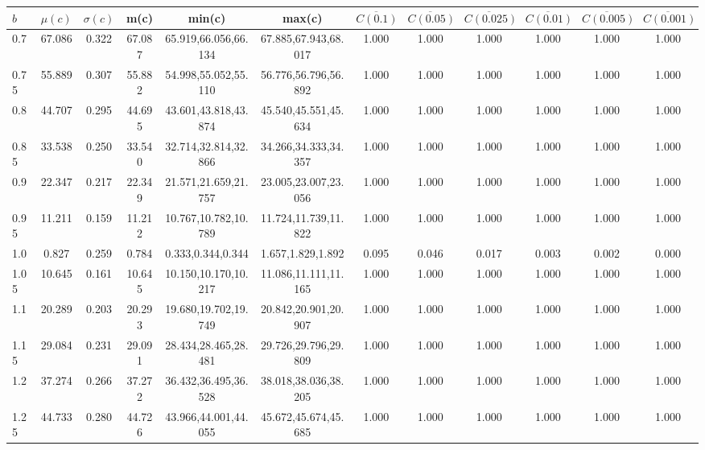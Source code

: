 \begin{table*}[h!]
\begin{center}
\begin{tabular}{| l | c | c | c | c | c | c | c | c | c | c | c |}\hline
$b$ & $\mu(c)$ & $\sigma(c)$ & m(c) & min(c) & max(c) & $\overline{C(0.1)}$ & $\overline{C(0.05)}$ & $\overline{C(0.025)}$ & $\overline{C(0.01)}$ & $\overline{C(0.005)}$ & $\overline{C(0.001)}$ \\\hline
0.7 & 67.086 & 0.322 & 67.087 & 65.919,66.056,66.134 & 67.885,67.943,68.017  & 1.000  & 1.000  & 1.000  & 1.000  & 1.000  & 1.000 \\\hline
0.75 & 55.889 & 0.307 & 55.882 & 54.998,55.052,55.110 & 56.776,56.796,56.892  & 1.000  & 1.000  & 1.000  & 1.000  & 1.000  & 1.000 \\\hline
0.8 & 44.707 & 0.295 & 44.695 & 43.601,43.818,43.874 & 45.540,45.551,45.634  & 1.000  & 1.000  & 1.000  & 1.000  & 1.000  & 1.000 \\\hline
0.85 & 33.538 & 0.250 & 33.540 & 32.714,32.814,32.866 & 34.266,34.333,34.357  & 1.000  & 1.000  & 1.000  & 1.000  & 1.000  & 1.000 \\\hline
0.9 & 22.347 & 0.217 & 22.349 & 21.571,21.659,21.757 & 23.005,23.007,23.056  & 1.000  & 1.000  & 1.000  & 1.000  & 1.000  & 1.000 \\\hline
0.95 & 11.211 & 0.159 & 11.212 & 10.767,10.782,10.789 & 11.724,11.739,11.822  & 1.000  & 1.000  & 1.000  & 1.000  & 1.000  & 1.000 \\\hline
1.0 & 0.827 & 0.259 & 0.784 & 0.333,0.344,0.344 & 1.657,1.829,1.892  & 0.095  & 0.046  & 0.017  & 0.003  & 0.002  & 0.000 \\\hline
1.05 & 10.645 & 0.161 & 10.645 & 10.150,10.170,10.217 & 11.086,11.111,11.165  & 1.000  & 1.000  & 1.000  & 1.000  & 1.000  & 1.000 \\\hline
1.1 & 20.289 & 0.203 & 20.293 & 19.680,19.702,19.749 & 20.842,20.901,20.907  & 1.000  & 1.000  & 1.000  & 1.000  & 1.000  & 1.000 \\\hline
1.15 & 29.084 & 0.231 & 29.091 & 28.434,28.465,28.481 & 29.726,29.796,29.809  & 1.000  & 1.000  & 1.000  & 1.000  & 1.000  & 1.000 \\\hline
1.2 & 37.274 & 0.266 & 37.272 & 36.432,36.495,36.528 & 38.018,38.036,38.205  & 1.000  & 1.000  & 1.000  & 1.000  & 1.000  & 1.000 \\\hline
1.25 & 44.733 & 0.280 & 44.726 & 43.966,44.001,44.055 & 45.672,45.674,45.685  & 1.000  & 1.000  & 1.000  & 1.000  & 1.000  & 1.000 \\\hline

\end{tabular}
\end{center}
\end{table*}
